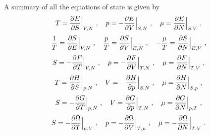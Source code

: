     A summary of all the equations of state is given by 
    \begin{equation*}
        T = \frac{\partial E}{\partial S} \Big \vert_{V,N} ~, \quad p = - \frac{\partial E}{\partial V} \Big \vert_{S,N} ~, \quad \mu = \frac{\partial E}{\partial N} \Big \vert_{S,V} ~,
    \end{equation*}
    \begin{equation*}
        \frac{1}{T} = \frac{\partial S}{\partial E} \Big \vert_{V, N} ~, \quad \frac{p}{T} = \frac{\partial S}{\partial V} \Big \vert_{E, N} ~, \quad - \frac{\mu}{T} = \frac{\partial S}{\partial N} \Big \vert_{E, V} ~,
    \end{equation*}
    \begin{equation*}
        S = - \frac{\partial F}{\partial T} \Big \vert_{V,N} ~, \quad p = - \frac{\partial F}{\partial V} \Big \vert_{T,N} ~, \quad \mu = \frac{\partial F}{\partial N} \Big \vert_{T,V} ~,
    \end{equation*}
    \begin{equation*}
        T = \frac{\partial H}{\partial S} \Big \vert_{p,N} ~, \quad V = - \frac{\partial H}{\partial p} \Big \vert_{S,N} ~, \quad \mu = \frac{\partial H}{\partial N} \Big \vert_{S, p} ~,
    \end{equation*}
    \begin{equation*}
        S = - \frac{\partial G}{\partial T} \Big \vert_{p,N} ~, \quad V = \frac{\partial G}{\partial p} \Big \vert_{T,N} ~, \quad \mu = \frac{\partial G}{\partial N} \Big \vert_{p,T} ~,
    \end{equation*}
    \begin{equation*}
        S = - \frac{\partial\Omega}{\partial T} \Big \vert_{\mu,V} ~, \quad p = - \frac{\partial\Omega}{\partial V} \Big \vert_{T,\mu} ~, \quad \mu = - \frac{\partial\Omega}{\partial N} \Big \vert_{T,V} ~.
    \end{equation*}

